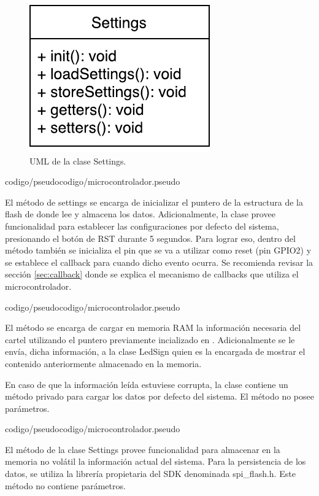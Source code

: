 \begin{figure}[!ht]
	\centering
	\includegraphics[scale=0.8]{imagenes/uml/settings.pdf}
	\caption{UML de la clase Settings.}
	\label{uml:settings}
\end{figure}

 {codigo/pseudocodigo/microcontrolador.pseudo}

El método  de settings se encarga de inicializar el puntero de la estructura de la flash de donde lee y almacena los datos.
Adicionalmente, la clase provee funcionalidad para establecer las configuraciones por defecto del sistema, presionando el botón de RST durante 5 segundos.
Para lograr eso, dentro del método  también se inicializa el pin que se va a utilizar como reset (pin GPIO2) y se establece el callback para cuando dicho evento ocurra.
Se recomienda revisar la sección \ref{sec:callback} donde se explica el mecanismo de callbacks que utiliza el microcontrolador.

 {codigo/pseudocodigo/microcontrolador.pseudo}

El método  se encarga de cargar en memoria RAM la información necesaria del cartel utilizando el puntero previamente incializado en .
Adicionalmente se le envía, dicha información, a la clase LedSign quien es la encargada de mostrar el contenido anteriormente almacenado en la memoria.

En caso de que la información leída estuviese corrupta, la clase contiene un método privado para cargar los datos por defecto del sistema.
El método no posee parámetros.

 {codigo/pseudocodigo/microcontrolador.pseudo}

El método  de la clase Settings provee funcionalidad para almacenar en la memoria no volátil la información actual del sistema.
Para la persistencia de los datos, se utiliza la librería propietaria del SDK denominada spi\_flash.h.
Este método no contiene parámetros.


